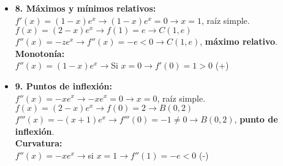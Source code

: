 \begin{itemize}
	\item \textbf{8. Máximos y mínimos relativos: }\\
	$f'(x)=(1-x)e^x \rightarrow (1-x)e^x = 0 \rightarrow x=1$, raíz simple.\\
	$f(x)=(2-x)e^x \rightarrow f(1)=e \rightarrow C(1,e)$\\
	$f''(x)=-ze^{x} \rightarrow f''(x)=-e < 0 \rightarrow C(1,e)$, \textbf{máximo relativo}.\\
	\textbf{Monotonía: }\\
	$f''(x)=(1-x)e^x \rightarrow $Si $x=0 \rightarrow f'(0) = 1>0$ (+) 
	\item \textbf{9. Puntos de inflexión:}\\
	$f''(x)=-xe^x \rightarrow -xe^x = 0 \rightarrow x=0$, raíz simple.\\
	$f(x)=(2-x)e^x \rightarrow f(0)=2 \rightarrow B(0,2)$\\
	$f'''(x)=-(x+1)e^x \rightarrow f'''(0)=-1 \neq 0 \rightarrow B(0,2)$, \textbf{punto de inflexión}.\\
	\textbf{Curvatura:}\\
	$f''(x)=-xe^x \rightarrow $si $x=1 \rightarrow f''(1)=-e<0$ (-)
	
\end{itemize}
